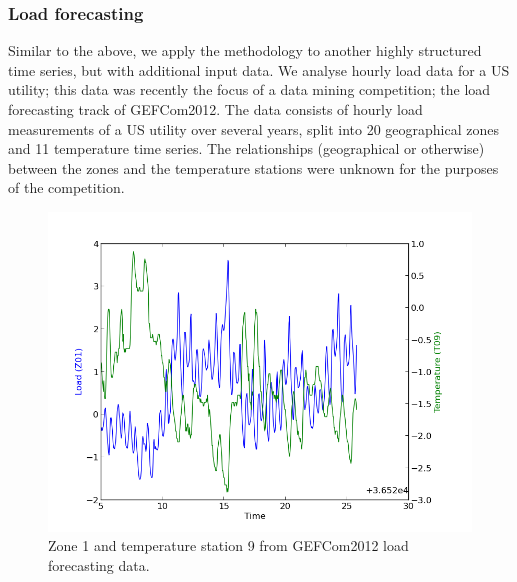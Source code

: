 \documentclass[twoside]{article}
\begin{document}



\subsubsection{Load forecasting}

Similar to the above, we apply the methodology to another highly structured time series, but with additional input data.
We analyse hourly load data for a US utility; this data was recently the focus of a data mining competition; the load forecasting track of GEFCom2012\footnotemark.
The data consists of hourly load measurements of a US utility over several years, split into 20 geographical zones and 11 temperature time series.
The relationships (geographical or otherwise) between the zones and the temperature stations were unknown for the purposes of the competition.

\begin{figure}
\includegraphics[width=\columnwidth]{../figures/gef_load_z01_t09_500}
\caption{Zone 1 and temperature station 9 from GEFCom2012 load forecasting data.}
\label{fig:gef_z01_t09}
\end{figure}
\end{document}
